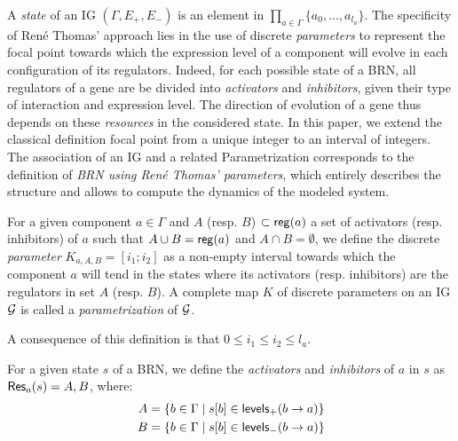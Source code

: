 A \emph{state} of an IG $(\Gamma, E_+, E_-)$ is an element in $\prod_{a \in \Gamma} \{a_0, \dots, a_{l_a}\}$.
The specificity of René Thomas' approach lies in the use of discrete \emph{parameters} to represent the focal point towards which the expression level of a component will evolve in each configuration of its regulators.
Indeed, for each possible state of a BRN, all regulators of a gene are be divided into \emph{activators} and \emph{inhibitors}, given their type of interaction and expression level.
The direction of evolution of a gene thus depends on these \emph{resources} in the considered state.
In this paper, we extend the classical definition focal point from a unique integer to an interval of integers.
The association of an IG and a related Parametrization corresponds to the definition of \emph{BRN using René Thomas' parameters}, which entirely describes the structure and allows to compute the dynamics of the modeled system.

\begin{definition}\label{def:param}
For a given component $a \in \Gamma$ and $A$ (resp. $B$) $\subset \mathsf{reg}({a})$ a set of activators (resp. inhibitors) of $a$ such that
$A \cup B = \mathsf{reg}({a})$ and $A \cap B = \emptyset$,
we define the discrete \emph{parameter} $K_{a,A,B} = [i_1; i_2]$ as a non-empty interval towards which the component $a$ will tend
in the states where its activators (resp. inhibitors) are the regulators in set $A$ (resp. $B$).
A complete map $K$ of discrete parameters on an IG $\mathcal{G}$ is called a \emph{parametrization} of $\mathcal{G}$.
\end{definition}
A consequence of this definition is that $0 \leq i_1 \leq i_2 \leq l_a$.

\begin{definition}\label{def:resources}
For a given state $s$ of a BRN, we define the \emph{activators} and \emph{inhibitors} of $a$ in $s$ as $\mathsf{Res}_{a}(s) = A,B$, where:
\begin{align*}
  A &= \{b \in \Gamma \mid {s[b]} \in \mathsf{levels}_+(b\rightarrow a)\} \\
  B &= \{b \in \Gamma \mid {s[b]} \in \mathsf{levels}_-(b\rightarrow a)\}
\end{align*}
\end{definition}

